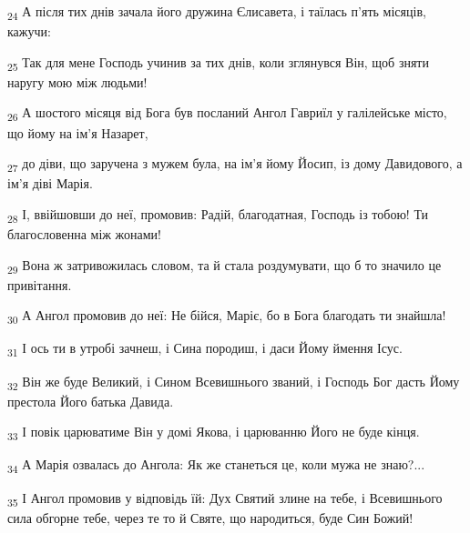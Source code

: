 \begin{tcolorbox}
\textsubscript{24} А після тих днів зачала його дружина Єлисавета, і таїлась п'ять місяців, кажучи:
\end{tcolorbox}
\begin{tcolorbox}
\textsubscript{25} Так для мене Господь учинив за тих днів, коли зглянувся Він, щоб зняти наругу мою між людьми!
\end{tcolorbox}
\begin{tcolorbox}
\textsubscript{26} А шостого місяця від Бога був посланий Ангол Гавриїл у галілейське місто, що йому на ім'я Назарет,
\end{tcolorbox}
\begin{tcolorbox}
\textsubscript{27} до діви, що заручена з мужем була, на ім'я йому Йосип, із дому Давидового, а ім'я діві Марія.
\end{tcolorbox}
\begin{tcolorbox}
\textsubscript{28} І, ввійшовши до неї, промовив: Радій, благодатная, Господь із тобою! Ти благословенна між жонами!
\end{tcolorbox}
\begin{tcolorbox}
\textsubscript{29} Вона ж затривожилась словом, та й стала роздумувати, що б то значило це привітання.
\end{tcolorbox}
\begin{tcolorbox}
\textsubscript{30} А Ангол промовив до неї: Не бійся, Маріє, бо в Бога благодать ти знайшла!
\end{tcolorbox}
\begin{tcolorbox}
\textsubscript{31} І ось ти в утробі зачнеш, і Сина породиш, і даси Йому ймення Ісус.
\end{tcolorbox}
\begin{tcolorbox}
\textsubscript{32} Він же буде Великий, і Сином Всевишнього званий, і Господь Бог дасть Йому престола Його батька Давида.
\end{tcolorbox}
\begin{tcolorbox}
\textsubscript{33} І повік царюватиме Він у домі Якова, і царюванню Його не буде кінця.
\end{tcolorbox}
\begin{tcolorbox}
\textsubscript{34} А Марія озвалась до Ангола: Як же станеться це, коли мужа не знаю?...
\end{tcolorbox}
\begin{tcolorbox}
\textsubscript{35} І Ангол промовив у відповідь їй: Дух Святий злине на тебе, і Всевишнього сила обгорне тебе, через те то й Святе, що народиться, буде Син Божий!
\end{tcolorbox}
